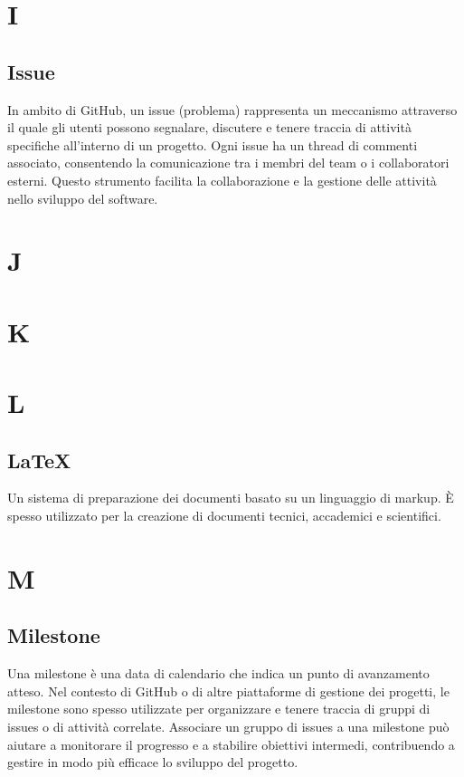 \documentclass[8pt]{article}
\begin{document}
	\section*{I}
	\subsection*{Issue}
	In ambito di GitHub, un issue (problema) rappresenta un meccanismo attraverso il quale gli utenti possono segnalare, discutere e tenere traccia di attività specifiche all'interno di un progetto. Ogni issue ha un thread di commenti associato, consentendo la comunicazione tra i membri del team o i collaboratori esterni. Questo strumento facilita la collaborazione e la gestione delle attività nello sviluppo del software.
	\newpage
	\section*{J}
	
	\section*{K}
	
	\section*{L}
	\subsection*{LaTeX}
	Un sistema di preparazione dei documenti basato su un linguaggio di markup. È spesso utilizzato per la creazione di documenti tecnici, accademici e scientifici.
	\newpage
	\section*{M}
	\subsection*{Milestone}
	Una milestone è una data di calendario che indica un punto di avanzamento atteso. Nel contesto di GitHub o di altre piattaforme di gestione dei progetti, le milestone sono spesso utilizzate per organizzare e tenere traccia di gruppi di issues o di attività correlate. Associare un gruppo di issues a una milestone può aiutare a monitorare il progresso e a stabilire obiettivi intermedi, contribuendo a gestire in modo più efficace lo sviluppo del progetto.
	\newpage
\end{document}
